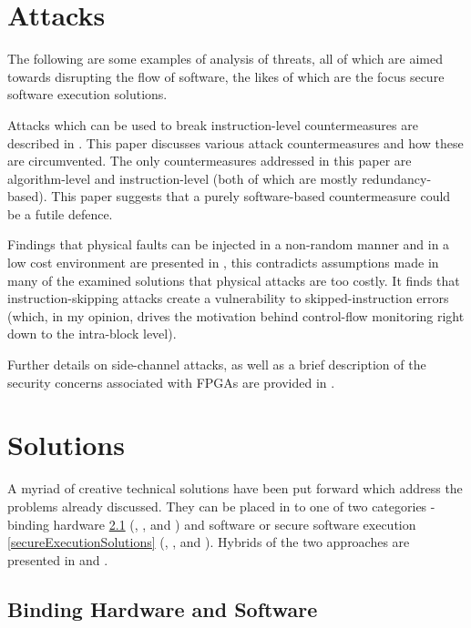 \section{Attacks}

The following are some examples of analysis of threats, all of which are aimed towards disrupting the flow of software, the likes of which are the focus secure software execution solutions. 

Attacks which can be used to break instruction-level countermeasures are described in \cite{Yuce2016a}. This paper discusses various attack countermeasures and how these are circumvented. The only countermeasures addressed in this paper are algorithm-level and instruction-level (both of which are mostly redundancy-based). This paper suggests that a purely software-based countermeasure could be a futile defence.

Findings that physical faults can be injected in a non-random manner and in a low cost environment are presented in \cite{Kelly2017}, this contradicts assumptions made in many of the examined solutions that physical attacks are too costly. It finds that instruction-skipping attacks create a vulnerability to skipped-instruction errors (which, in my opinion, drives the motivation behind control-flow monitoring right down to the intra-block level).

Further details on side-channel attacks, as well as a brief description of the security concerns associated with FPGAs are provided in \cite{GebotysCatherineH2010Sied}.

\section{Solutions}

A myriad of creative technical solutions have been put forward which address the problems already discussed. They can be placed in to one of two categories - binding hardware \ref{bindingSolutions} (\cite{Lee2016}, \cite{Schaller2014}, \cite{Gora2010} and \cite{Simpson2006}) and software or secure software execution \ref{secureExecutionSolutions} (\cite{Werner2016}, \cite{Wang2016}, \cite{Abera2016} and \cite{Arora2006}). Hybrids of the two approaches are presented in \cite{Kleber2015} and \cite{Kohnhauser2015}.

\subsection{Binding Hardware and Software}\label{bindingSolutions}


